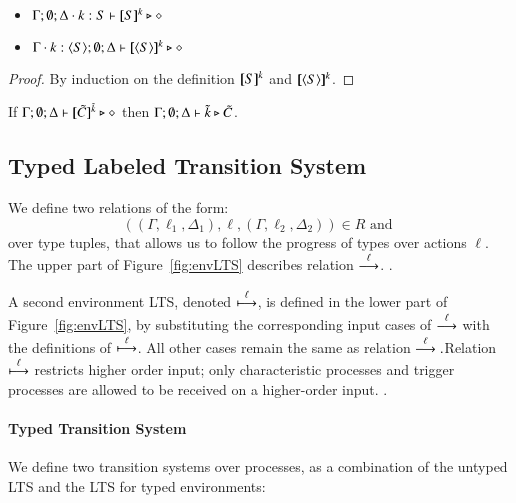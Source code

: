 \begin{proposition}\rm
$ $
	\begin{itemize}
		\item	$\Gamma; \emptyset; \Delta \cdot k:S \vdash [\!\![S]\!\!]^k \triangleright \diamond$
		\item	$\Gamma \cdot k:\langle S \rangle; \emptyset; \Delta \vdash [\!\![\langle S \rangle]\!\!]^k \triangleright \diamond$
	\end{itemize}
\end{proposition}

\begin{proof}
	By induction on the definition $[\!\![S]\!\!]^k$ and $[\!\![\langle S \rangle]\!\!]^k$.
\end{proof}

\begin{corollary}\rm
	If $\Gamma; \emptyset; \Delta \vdash [\!\![\tilde{C}]\!\!]^{\tilde{k}} \triangleright \diamond$
	then
	$\Gamma; \emptyset; \Delta \vdash \tilde{k} \triangleright \tilde{C}$.
\end{corollary}


\subsection{Typed Labeled Transition System}



We define two relations of the form:
%
\[
	((\Gamma, \ell_1, \Delta_1), \ell, (\Gamma, \ell_2, \Delta_2)) \in R \textrm{ and }
\]
%
\noi over type tuples, that allows us to follow the progress of types over actions $\ell$.
The upper part of Figure~\ref{fig:envLTS} describes relation $\stackrel{\ell}{\longrightarrow}$.
.

A second environment LTS, denoted $\stackrel{\ell}{\longmapsto}$, is defined in the lower part of
Figure~\ref{fig:envLTS}, by substituting the corresponding input cases
of $\stackrel{\ell}{\longrightarrow}$ with the definitions of $\stackrel{\ell}{\longmapsto}$. All other 
cases remain the same as relation $\stackrel{\ell}{\longrightarrow}. $Relation $\stackrel{\ell}{\longmapsto}$ 
restricts higher order input; only characteristic processes and trigger processes
are allowed to be received on a higher-order input.
. 

\paragraph{Typed Transition System}

We define two transition systems over processes, as a combination
of the untyped LTS and the LTS for typed environments:

